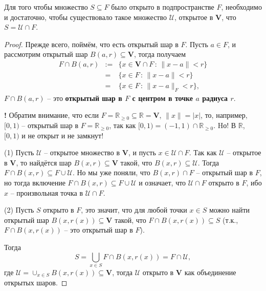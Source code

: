 \begin{proposition}\label{open_in_subset}
    Для того чтобы множество $S \subseteq F$ было открыто в подпространстве $F$, необходимо и достаточно, чтобы существовало такое множество $\mathscr{U}$, открытое в $\mathbf{V}$, что $S = \mathscr{U} \cap F.$
\end{proposition}

\begin{proof}
    Прежде всего, поймём, что есть открытый шар в $F$. Пусть $a \in F$, и рассмотрим открытый шар $B(a,r) \subseteq \mathbf{V}$, тогда получаем
    \begin{eqnarray*}
        F \cap B(a,r) &:=& \{x \in \mathbf{V} \cap F\, :\, \|x-a\|<r\} \\
        &=&\{x\in F\, :\, \|x-a\|<r\} \\
        &=& \{x \in F\, :\, \|x-a\|_F<r\},
    \end{eqnarray*}
    \ie $F \cap B(a,r)$ -- это \textbf{открытый шар в $F$ с центром в точке $a$ радиуса $r.$}

\begin{mydanger}{\bf{!}}
    Обратим внимание, что если $F = \mathbb{R}_{\ge 0} \subseteq \mathbb{R} = \mathbf{V}$, $\|x\| = |x|$, то, например, $[0,1)$ -- открытый шар в $F = \mathbb{R}_{\ge 0}$, так как $[0,1) = (-1,1) \cap \mathbb{R}_{\ge 0}$. Hо! В $\mathbb{R}$, $[0,1)$ и не открыт и не замкнут!
\end{mydanger}

(1) Пусть $\mathscr{U}$ -- открытое множество в $\mathbf{V}$, и пусть $x \in \mathscr{U} \cap F$. Так как $\mathscr{U}$ -- открытое в $\mathbf{V}$, то найдётся шар $B(x,r) \subseteq \mathbf{V}$ такой, что $B(x,r) \subseteq \mathscr{U}$. Тогда $F \cap B(x,r) \subseteq F \cup \mathscr{U}$. Но мы уже поняли, что $B(x,r) \cap F$ -- открытый шар в $F$, но тогда включение $F \cap B(x,r) \subseteq F \cup \mathscr{U}$ и означает, что $\mathscr{U} \cap F$ открыто в $F$, ибо $x$ -- произвольная точка в $\mathscr{U} \cap F.$

(2) Пусть $S$ открыто в $F$, это значит, что для любой точки $x \in S$ можно найти открытый шар $B(x, r(x)) \subseteq \mathbf{V}$ такой, что $F \cap B(x,r(x)) \subseteq S$ (т.к., $F \cap B(x,r(x))$ -- это открытый шар в $F$).

Тогда 
\[
 S = \bigcup_{x \in S} F \cap B(x, r(x)) = F \cap \mathscr{U},
\]
где $\mathscr{U} = \cup_{x\in S} B(x, r(x)) \subseteq \mathbf{V}$, тогда $\mathscr{U}$ открыто в $\mathbf{V}$ как объединение открытых шаров.
\end{proof}





